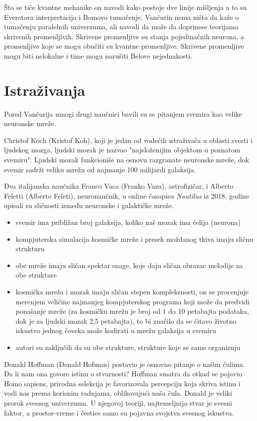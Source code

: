 \documentclass[a4paper]{article}
\begin{document}
Što se tiče kvantne mehanike on navodi kako postoje dve linije mišljenja a to su Everetova interpretacija i Bomovo tumačenje. Vančurin nema ništa da kaže o tumačenju paralelnih univerzuma, ali navodi da može da doprinese teorijama skrivenih promenljivih. Skrivene promenljive su stanja pojedinačnih neurona, a promenljive koje se mogu obučiti su kvantne promenljive. Skrivene promenljive mogu biti nelokalne i time mogu narušiti Belove nejednakosti.


\section{Istraživanja}
Pored Vančurija mnogi drugi naučnici bavili su se pitanjem svemira kao velike neuronske mreže. 

Christof Koch (Kristof Koh), koji je jedan od vodećih istraživača u oblasti svesti i ljudskog mozga, ljudski mozak je nazvao "najsloženijim objektom u poznatom svemiru". Ljudski mozak funkcioniše na osnovu razgranate neuronske mreže, dok svemir sadrži veliku mrežu od najmanje 100 milijardi galaksija. 

Dva italijanska naučnika Franco Vaca (Franko Vaza), astrofizičar, i Alberto Feletti (Alberto Feleti), neuronaučnik, u online časopisu \textit{Nautilus} iz 2018. godine opisali su sličnosti između neuronske i galaktičke mreže. 
\begin{itemize}
  \item svemir ima približan broj galaksija, koliko naš mozak ima ćelija (neurona) 
  \item kompjuterska simulacija kosmičke mreže i presek moždanog tkiva imaju sličnu strukturu 
  \item obe mreže imaju sličan spektar snage, koje daju sličan obrazac melodije za obe strukture 
  \item kosmička mreža i mozak imaju sličan stepen kompleksnosti, on se procenjuje merenjem veličine najmanjeg kompjuterskog programa koji može da predvidi ponašanje mreže (za kosmičku mrežu je broj od 1 do 10 petabajta podataka, dok je za ljudski mozak 2,5 petabajta), to bi značilo da se čitavo životno iskustvo jednog čoveka može kodirati u mrežu galaksija u svemiru
  \item autori su zaključili da su obe strukture, strukture koje se same organizuju
\end{itemize}

Donald Hoffman (Donald Hofman) postavio je osnovno pitanje o našim čulima. Da li nam ona govore istinu o stvarnosti? Hoffman smatra da otkad se pojavio Homo sapiens, prirodna selekcija je favorizovala percepciju koja skriva istinu i vodi nas prema korisnim radnjama, oblikovajući naša čula. Donald je veliki prorok svesnog univerzuma. U njegovoj teoriji, najtemeljnija stvar je svesni faktor, a prostor-vreme i čestice samo su pojavna svojstva svesnog iskustva. 
\end{document}
